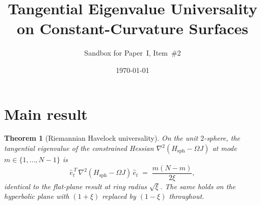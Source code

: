 \documentclass[11pt]{article}
\title{Tangential Eigenvalue Universality on Constant-Curvature Surfaces}
\author{Sandbox for Paper~I, Item~\#2}
\date{\today}
\newtheorem{theorem}{Theorem}
\theoremstyle{remark}
\begin{document}
\maketitle

\section*{Main result}

\begin{theorem}[Riemannian Havelock universality]\label{thm:rh-univ}
On the unit $2$-sphere, the tangential eigenvalue of the constrained
Hessian $\nabla^2(H_{\mathrm{sph}} - \Omega J)$ at mode
$m \in \{1, \ldots, N-1\}$ is
\[
  \hat e_t^{\,T}\,\nabla^2(H_{\mathrm{sph}} - \Omega J)\,\hat e_t
  \;=\; \frac{m(N-m)}{2\xi},
\]
identical to the flat-plane result at ring radius $\sqrt{\xi}$.
The same holds on the hyperbolic plane with $(1+\xi)$ replaced by
$(1-\xi)$ throughout.
\end{theorem}
\end{document}
